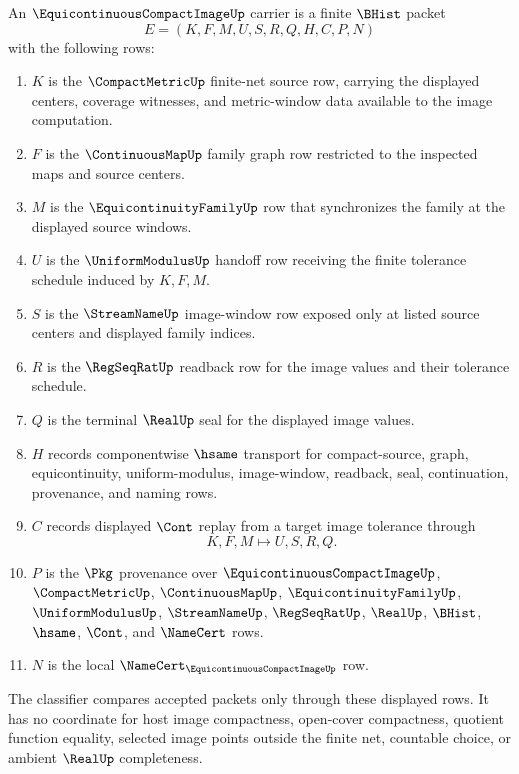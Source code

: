 \begin{definition}\label{def:equicontinuous-compact-image-carrier}
An $\EquicontinuousCompactImageUp$ carrier is a finite $\BHist$ packet
$$
E=(K,F,M,U,S,R,Q,H,C,P,N)
$$
with the following rows:
\begin{enumerate}
\item $K$ is the $\CompactMetricUp$ finite-net source row, carrying the displayed centers, coverage witnesses, and metric-window data available to the image computation.
\item $F$ is the $\ContinuousMapUp$ family graph row restricted to the inspected maps and source centers.
\item $M$ is the $\EquicontinuityFamilyUp$ row that synchronizes the family at the displayed source windows.
\item $U$ is the $\UniformModulusUp$ handoff row receiving the finite tolerance schedule induced by $K,F,M$.
\item $S$ is the $\StreamNameUp$ image-window row exposed only at listed source centers and displayed family indices.
\item $R$ is the $\RegSeqRatUp$ readback row for the image values and their tolerance schedule.
\item $Q$ is the terminal $\RealUp$ seal for the displayed image values.
\item $H$ records componentwise $\hsame$ transport for compact-source, graph, equicontinuity, uniform-modulus, image-window, readback, seal, continuation, provenance, and naming rows.
\item $C$ records displayed $\Cont$ replay from a target image tolerance through
$$
K,F,M \longmapsto U,S,R,Q .
$$
\item $P$ is the $\Pkg$ provenance over $\EquicontinuousCompactImageUp$, $\CompactMetricUp$, $\ContinuousMapUp$, $\EquicontinuityFamilyUp$, $\UniformModulusUp$, $\StreamNameUp$, $\RegSeqRatUp$, $\RealUp$, $\BHist$, $\hsame$, $\Cont$, and $\NameCert$ rows.
\item $N$ is the local $\NameCert_{\EquicontinuousCompactImageUp}$ row.
\end{enumerate}
The classifier compares accepted packets only through these displayed rows. It has no coordinate for host image compactness, open-cover compactness, quotient function equality, selected image points outside the finite net, countable choice, or ambient $\RealUp$ completeness.
\end{definition}

